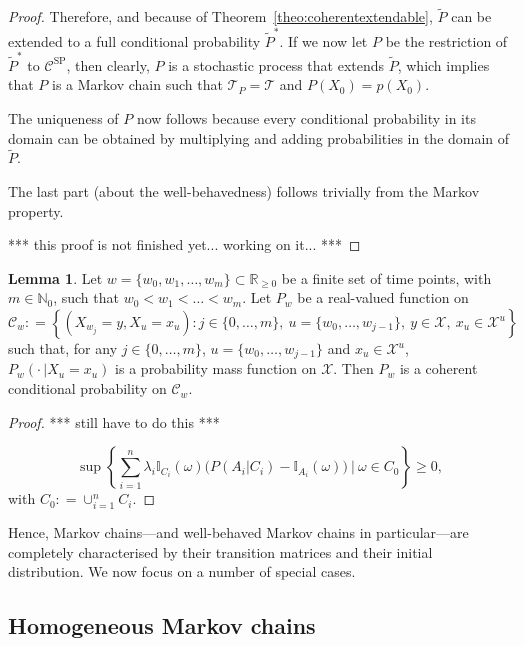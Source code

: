 \documentclass[10pt]{paper}
\theoremstyle{definition}
\newtheorem{lemma}[theorem]{Lemma}
\newcommand{\nats}{\mathbb{N}}
\newcommand{\reals}{\mathbb{R}}
\newcommand{\states}{\mathcal{X}}
\newcommand{\ind}[1]{\mathbb{I}_{#1}}
\newcommand{\coloneqq}{:\!=}
\begin{document}
\begin{proof}
Therefore, and because of Theorem~\ref{theo:coherentextendable}, $\tilde{P}$ can be extended to a full conditional probability $\tilde{P}^*$. If we now let $P$ be the restriction of $\tilde{P}^*$ to $\mathcal{C}^\mathrm{SP}$, then clearly, $P$ is a stochastic process that extends $\tilde{P}$, which implies that $P$ is a Markov chain such that $\mathcal{T}_P=\mathcal{T}$ and $P(X_0)=p(X_0)$. 

The uniqueness of $P$ now follows because every conditional probability in its domain can be obtained by multiplying and adding probabilities in the domain of $\tilde{P}$.

The last part (about the well-behavedness) follows trivially from the Markov property.

*** this proof is not finished yet... working on it... ***
\end{proof}

\begin{lemma}\label{lemma:simplechaincoherence}
Let $w=\{w_0,w_1,\dots,w_m\}\subset\reals_{\geq0}$ be a finite set of time points, with $m\in\nats_0$, such that $w_0<w_1<\dots<w_m$.
Let $P_w$ be a real-valued function on
\begin{equation*}
\mathcal{C}_w\coloneqq
\left\{
(X_{w_j}=y,X_u=x_u)
\colon 
j\in\{0,\dots,m\},~
u=\{w_0,\dots,w_{j-1}\},~
y\in\states,~
x_u\in\states^u
\right\}
\end{equation*}
such that, for any $j\in\{0,\dots,m\}$, $u=\{w_0,\dots,w_{j-1}\}$ and $x_u\in\states^u$, $P_w(\cdot\,\vert X_u=x_u)$ is a probability mass function on $\states$. Then $P_w$ is a coherent conditional probability on $\mathcal{C}_w$.
\end{lemma}
\begin{proof}
*** still have to do this ***

\begin{equation*}
\sup\left\{\sum_{i=1}^n\lambda_i\ind{C_i}(\omega)\bigl(P(A_i\vert C_i)-\ind{A_i}(\omega)\bigr)~\Bigg\vert~\omega\in C_0\right\}\geq0,
\end{equation*}
with $C_0\coloneqq\cup_{i=1}^nC_i$.
\end{proof}


Hence, Markov chains---and well-behaved Markov chains in particular---are completely characterised by their transition matrices and their initial distribution. 
We now focus on a number of special cases.

\subsection{Homogeneous Markov chains}
\end{document}
